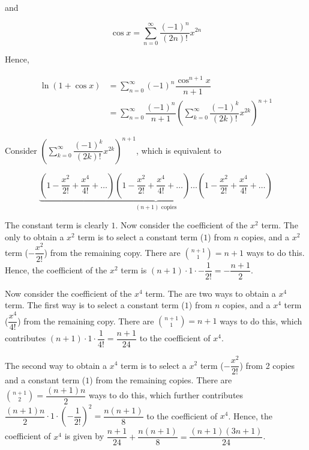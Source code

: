 \documentclass{jhwhw}
\begin{document}
        and 

        \begin{equation*}
            \cos x = \sum_{n=0}^\infty \dfrac{(-1)^n}{(2n)!} x^{2n}
        \end{equation*}

        Hence,

        \begin{align*}
            \ln (1 + \cos x) &= \sum_{n=0}^\infty (-1)^n \dfrac{\cos^{n+1} x}{n+1}\\
            &= \sum_{n=0}^\infty \dfrac{(-1)^n}{n+1} \left(\sum_{k=0}^\infty \dfrac{(-1)^k}{(2k)!} x^{2k} \right)^{n+1}
        \end{align*}

        Consider $\left(\sum_{k=0}^\infty \dfrac{(-1)^k}{(2k)!} x^{2k} \right)^{n+1}$, which is equivalent to

        \begin{equation*}
            \underbrace{\left(1 - \dfrac{x^2}{2!} + \dfrac{x^4}{4!} + \ldots \right)\left(1 - \dfrac{x^2}{2!} + \dfrac{x^4}{4!} + \ldots \right)\ldots\left(1 - \dfrac{x^2}{2!} + \dfrac{x^4}{4!} + \ldots \right)}_\text{$(n + 1)$ copies}
        \end{equation*}

        The constant term is clearly $1$. Now consider the coefficient of the $x^2$ term. The only to obtain a $x^2$ term is to select a constant term ($1$) from $n$ copies, and a $x^2$ term ($-\dfrac{x^2}{2!}$) from the remaining copy. There are $\displaystyle\binom{n+1}{1} = n+1$ ways to do this. Hence, the coefficient of the $x^2$ term is $(n+1) \cdot 1 \cdot -\dfrac{1}{2!} = -\dfrac{n+1}2$.

        Now consider the coefficient of the $x^4$ term. The are two ways to obtain a $x^4$ term. The first way is to select a constant term ($1$) from $n$ copies, and a $x^4$ term ($\dfrac{x^4}{4!}$) from the remaining copy. There are $\displaystyle\binom{n+1}1 = n+1$ ways to do this, which contributes $(n+1) \cdot 1 \cdot \dfrac{1}{4!} = \dfrac{n+1}{24}$ to the coefficient of $x^4$.

        The second way to obtain a $x^4$ term is to select a $x^2$ term ($-\dfrac{x^2}{2!}$) from 2 copies and a constant term ($1$) from the remaining copies. There are $\displaystyle \binom{n+1}{2} = \dfrac{(n+1)n}2$ ways to do this, which further contributes $\dfrac{(n+1)n}2 \cdot 1 \cdot \left(-\dfrac{1}{2!}\right)^2 = \dfrac{n(n+1)}8$ to the coefficient of $x^4$. Hence, the coefficient of $x^4$ is given by $\dfrac{n+1}{24} + \dfrac{n(n+1)}8 = \dfrac{(n+1)(3n + 1)}{24}$. 
\end{document}

